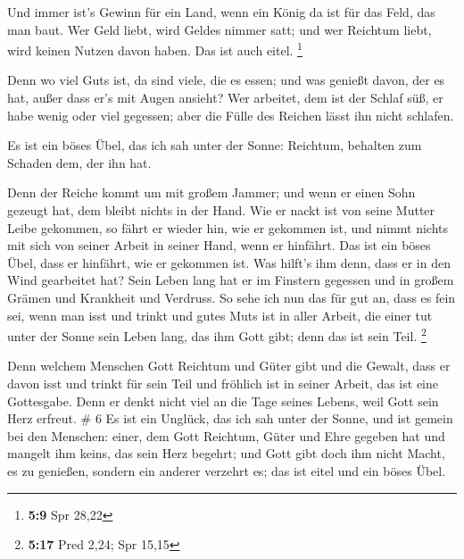  Und immer ist's Gewinn für ein Land, wenn ein König da ist
für das Feld, das man baut.  Wer Geld liebt, wird Geldes
nimmer satt; und wer Reichtum liebt, wird keinen Nutzen davon haben. Das
ist auch eitel. \footnote{\textbf{5:9} Spr 28,22}

 Denn wo viel Guts ist, da sind viele, die es essen; und
was genießt davon, der es hat, außer dass er's mit Augen ansieht?
 Wer arbeitet, dem ist der Schlaf süß, er habe wenig oder
viel gegessen; aber die Fülle des Reichen lässt ihn nicht schlafen.

 Es ist ein böses Übel, das ich sah unter der Sonne:
Reichtum, behalten zum Schaden dem, der ihn hat.

 Denn der Reiche kommt um mit großem Jammer; und wenn er
einen Sohn gezeugt hat, dem bleibt nichts in der Hand.  Wie
er nackt ist von seine Mutter Leibe gekommen, so fährt er wieder hin,
wie er gekommen ist, und nimmt nichts mit sich von seiner Arbeit in
seiner Hand, wenn er hinfährt.  Das ist ein böses Übel,
dass er hinfährt, wie er gekommen ist. Was hilft's ihm denn, dass er in
den Wind gearbeitet hat?  Sein Leben lang hat er im
Finstern gegessen und in großem Grämen und Krankheit und Verdruss.
 So sehe ich nun das für gut an, dass es fein sei, wenn man
isst und trinkt und gutes Muts ist in aller Arbeit, die einer tut unter
der Sonne sein Leben lang, das ihm Gott gibt; denn das ist sein Teil.
\footnote{\textbf{5:17} Pred 2,24; Spr 15,15}

 Denn welchem Menschen Gott Reichtum und Güter gibt und die
Gewalt, dass er davon isst und trinkt für sein Teil und fröhlich ist in
seiner Arbeit, das ist eine Gottesgabe.  Denn er denkt
nicht viel an die Tage seines Lebens, weil Gott sein Herz erfreut. \# 6
 Es ist ein Unglück, das ich sah unter der Sonne, und ist
gemein bei den Menschen:  einer, dem Gott Reichtum, Güter
und Ehre gegeben hat und mangelt ihm keins, das sein Herz begehrt; und
Gott gibt doch ihm nicht Macht, es zu genießen, sondern ein anderer
verzehrt es; das ist eitel und ein böses Übel.

